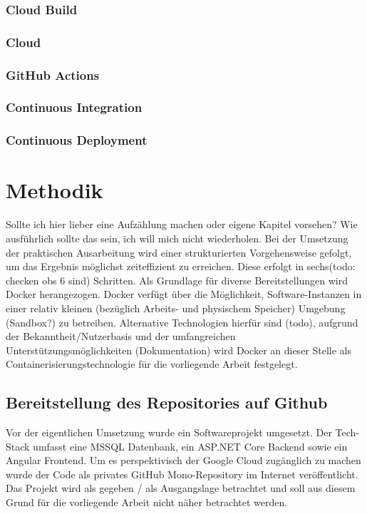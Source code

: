 \documentclass[pdftex,a4paper,abstracton,11pt,parskip=half,bibtotocnumbered]{scrartcl}
\begin{document}
		\subsubsection{Cloud Build}
		\subsubsection{Cloud }
		\subsubsection{GitHub Actions}
		\subsubsection{Continuous Integration}
		\subsubsection{Continuous Deployment}

\section{Methodik}
	Sollte ich hier lieber eine Aufzählung machen oder eigene Kapitel vorsehen? Wie ausführlich sollte das sein, ich will mich nicht wiederholen. 
	Bei der Umsetzung der praktischen Ausarbeitung wird einer strukturierten Vorgehensweise gefolgt, um das Ergebnis möglichst zeiteffizient zu 
	erreichen. Diese erfolgt in sechs(todo: checken obs 6 sind) Schritten.
	Als Grundlage für diverse Bereitstellungen wird Docker herangezogen. Docker verfügt über die Möglichkeit, Software-Instanzen in einer relativ kleinen 
	(bezüglich Arbeits- und physischem Speicher) Umgebung (Sandbox?) zu betreiben. Alternative Technologien hierfür sind (todo), aufgrund der 
	Bekanntheit/Nutzerbasis und der	umfangreichen Unterstützungsmöglichkeiten (Dokumentation) wird Docker an dieser Stelle als Containerisierungstechnologie
	für die vorliegende Arbeit festgelegt.  

	\subsection{Bereitstellung des Repositories auf Github}
	Vor der eigentlichen Umsetzung wurde ein Softwareprojekt umgesetzt. Der Tech-Stack umfasst eine MSSQL Datenbank, ein ASP.NET Core Backend sowie	ein
	Angular Frontend. Um es perspektivisch der Google Cloud zugänglich zu machen wurde der Code als privates GitHub Mono-Repository im Internet veröffentlicht.
	Das Projekt wird als gegeben / als Ausgangslage betrachtet und soll aus diesem Grund für die vorliegende Arbeit nicht näher betrachtet werden.  
\end{document}
